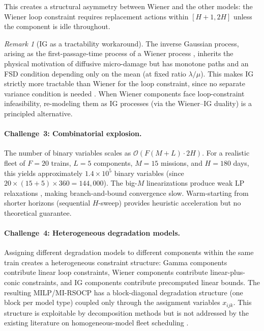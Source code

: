 \documentclass[11pt,a4paper]{article}
\theoremstyle{plain}
\theoremstyle{definition}
\theoremstyle{remark}
\newtheorem{remark}[theorem]{Remark}
\begin{document}
This creates a structural asymmetry between Wiener and the other models:
the Wiener loop constraint requires replacement
actions within $[H{+}1, 2H]$ unless the component is idle throughout.

\begin{remark}[IG as a tractability workaround]\label{rem:ig_workaround}
The inverse Gaussian process, arising as the first-passage-time process of a
Wiener process \cite{tweedie1957,wang2010}, inherits the physical motivation
of diffusive micro-damage but has monotone paths and an FSD condition
depending only on the mean (at fixed ratio $\lambda/\mu$). This makes IG
strictly more tractable than Wiener for the loop constraint, since no
separate variance condition is needed \cite{ye2014}. When Wiener components
face loop-constraint infeasibility, re-modeling them as IG processes (via the
Wiener--IG duality) is a principled alternative.
\end{remark}

\paragraph{Challenge~3: Combinatorial explosion.}
The number of binary variables scales as $\mathcal{O}(F(M + L) \cdot 2H)$.
For a realistic fleet of $F = 20$ trains, $L = 5$ components, $M = 15$ missions,
and $H = 180$ days, this yields approximately $1.4 \times 10^5$ binary variables
(since $20 \times (15 + 5) \times 360 = 144{,}000$).
The big-$M$ linearizations
produce weak LP relaxations \cite{conforti2014}, making branch-and-bound
convergence slow. Warm-starting from shorter horizons (sequential $H$-sweep)
provides heuristic acceleration but no theoretical guarantee.

\paragraph{Challenge~4: Heterogeneous degradation models.}
Assigning different degradation models to different components within the same
train creates a heterogeneous constraint structure: Gamma components contribute
linear loop constraints, Wiener components contribute linear-plus-conic
constraints, and IG components contribute precomputed linear bounds. The resulting
MILP/MI-RSOCP has a block-diagonal degradation structure (one block per model type)
coupled only through the assignment variables $x_{ijk}$. This structure is
exploitable by decomposition methods \cite{conforti2014} but is not addressed
by the existing literature on homogeneous-model fleet scheduling \cite{railcarMILP2025,dariano2017}.
\end{document}
